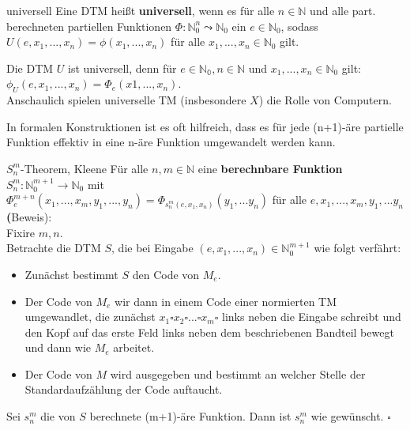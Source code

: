 \begin{defn}{universell}
    Eine DTM heißt \textbf{universell}, wenn es für alle $n \in \mathbb{N}$ und alle part. berechneten 
    partiellen Funktionen $\Phi : \mathbb{N}_0^n \leadsto \mathbb{N}_0$ ein $e \in \mathbb{N}_0$, sodass
    $U(e,x_1,...,x_n) = \phi(x_1,...,x_n)$ für alle $x_1,...,x_n \in \mathbb{N}_0$ gilt. 
\end{defn}

\begin{bem}
    Die DTM $U$ ist universell, denn für $e \in \mathbb{N_0}, n \in \mathbb{N}$ und $x_1,...,x_n \in \mathbb{N}_0$ gilt: \\
    $\phi_U(e,x_1,...,x_n) = \Phi_e(x1,...,x_n)$. \\

    Anschaulich spielen universelle TM (insbesondere $X$) die Rolle von Computern.
\end{bem}

In formalen Konstruktionen ist es oft hilfreich, dass es für jede (n+1)-äre partielle Funktion effektiv in eine n-äre
Funktion umgewandelt werden kann.

\begin{satz}{$S^m_n$-Theorem, Kleene}
    Für alle $n,m \in \mathbb{N}$ eine \textbf{berechnbare Funktion} $S^m_n : \mathbb{N}_0^{m+1} \rightarrow \mathbb{N}_0$ mit \\
    $\Phi^{m+n}_e(x_1,...,x_m,y_1,...,y_n) = \Phi_{s^m_n(e,x_1,x_n)}(y_1,...y_n)$ für alle $e,x_1,...,x_m,y_1,...y_n$ \\

    \textbf(Beweis):\\
    Fixire $m,n$. \\
    Betrachte die DTM $S$, die bei Eingabe $(e,x_1,...,x_n) \in \mathbb{N}^{m+1}_0$ wie folgt verfährt:
    \begin{itemize}
        \item Zunächst bestimmt $S$ den Code von $M_e$.
        \item Der Code von $M_e$ wir dann in einem Code einer normierten TM umgewandlet,
              die zunächst $x_1 \square x_2 \square ... \square x_m \square$ links neben
              die Eingabe schreibt und den Kopf auf das erste Feld links neben dem beschriebenen
              Bandteil bewegt und dann wie $M_e$ arbeitet.
        \item Der Code von $M$ wird ausgegeben und bestimmt an welcher Stelle der Standardaufzählung
              der Code auftaucht.
    \end{itemize}
    Sei $s^m_n$ die von $S$ berechnete (m+1)-äre Funktion. Dann ist $s^m_n$ wie gewünscht. $\square$
\end{satz}
